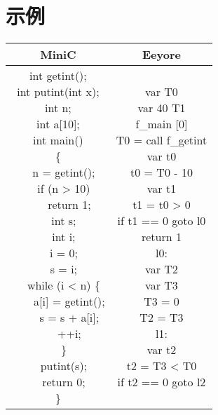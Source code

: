 \documentclass{ctexart}
\newenvironment{typewriterfont}{\ttfamily}{\par}
\begin{document}
\section{示例}
\begin{table}[H]
    \centering
    \small
    \begin{typewriterfont}
    \begin{tabular}{|c|c|}
        \hline
        MiniC & Eeyore \\
        \hline
        \makecell[l]{
int getint();\\
int putint(int x);\\
int n;\\
int a[10];\\
int main()\\
\{\\
\ \ n = getint();\\
\ \ if (n > 10)\\
\ \ \ \ return 1;\\
\ \ int s;\\
\ \ int i;\\
\ \ i = 0;\\
\ \ s = i;\\
\ \ while (i < n) \{\\
\ \ \ \ a[i] = getint();\\
\ \ \ \ s = s + a[i];\\
\ \ \ \ ++i;\\
\ \ \}\\
\ \ putint(s);\\
\ \ return 0;\\
\}
        } & \makecell[l]{
var T0\\
var 40 T1\\
f\_main [0]\\
T0 = call f\_getint\\
var t0\\
t0 = T0 - 10\\
var t1\\
t1 = t0 > 0\\
if t1 == 0 goto l0\\
return 1\\
l0:\\
var T2\\
var T3\\
T3 = 0\\
T2 = T3\\
l1:\\
var t2\\
t2 = T3 < T0\\
if t2 == 0 goto l2\\
}
\end{tabular}
\end{typewriterfont}
\end{table}
\end{document}
